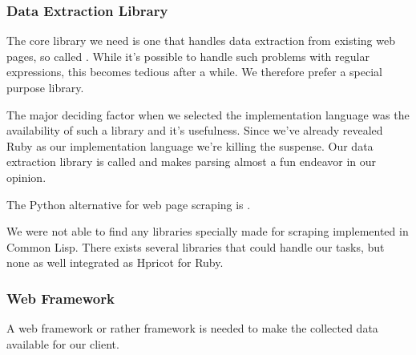 \subsubsection{Data Extraction Library}

The core library we need is one that handles data extraction from existing
web pages, so called  . While it's possible to
handle such problems with regular expressions, this becomes tedious after a
while. We therefore prefer a special purpose library.

The major deciding factor when we selected the implementation language was
the availability of such a library and it's usefulness. Since we've already
revealed Ruby as our implementation language we're killing the suspense.
Our data extraction library is called %
and makes  parsing almost a fun endeavor in our opinion.

The Python alternative for web page scraping is .

We were not able to find any libraries specially made for  scraping
implemented in Common Lisp. There exists several %
libraries that could handle our tasks, but none as well integrated as
Hpricot for Ruby.


\subsubsection{Web Framework}

A web framework or rather %
framework is needed to make the
collected data available for our client.

